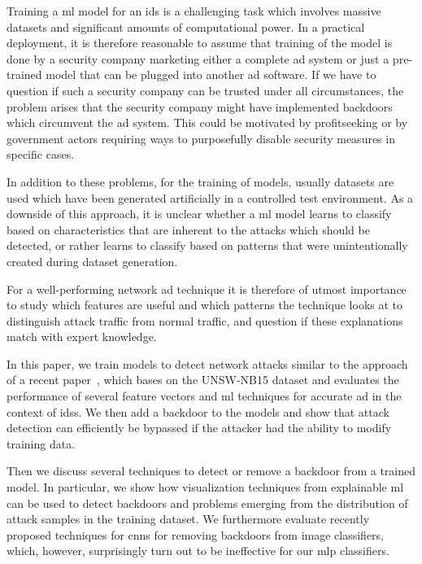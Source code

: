 \documentclass[9pt,sigconf,letterpaper,dvipsnames\ifx\removeHeaders\tempYes ,nonacm\fi]{acmart}
\newcommand{\unsw}{UNSW-NB15}
\begin{document}
Training a \gls{ml} model for an \gls{ids} is a challenging task which involves massive datasets and significant amounts of computational power. In a practical deployment, it is therefore reasonable to assume that training of the model is done by a security company marketing either a complete \gls{ad} system or just a pre-trained model that can be plugged into another \gls{ad} software. %
If we have to question if such a security company can be trusted under all circumstances, the problem arises that the security company might have implemented backdoors which circumvent the \gls{ad} system. This could be motivated by profitseeking or by government actors requiring ways to purposefully disable security measures in specific cases.

In addition to these problems, for the training of models, usually datasets are used which have been generated artificially in a controlled test environment. As a downside of this approach, it is unclear whether a \gls{ml} model learns to classify based on characteristics that are inherent to the attacks which should be detected, or rather learns to classify based on patterns that were unintentionally created during dataset generation.

For a well-performing network \gls{ad} technique it is therefore of utmost importance to study which features are useful and which patterns the technique looks at to distinguish attack traffic from normal traffic, and question if these explanations match with expert knowledge.

In this paper, we train models to detect network attacks similar to the approach of a recent paper~\cite{meghdouri_analysis_2018}, which bases on the \unsw{} dataset \cite{moustafa_unsw-nb15:_2015} and evaluates the performance of several feature vectors and \gls{ml} techniques for accurate \gls{ad} in the context of \glspl{ids}.
We then add a backdoor to the models and show that attack detection can efficiently be bypassed if the attacker had the ability to modify training data.

Then we discuss several techniques to detect or remove a backdoor from a trained model. In particular, we show how visualization techniques from explainable \gls{ml} can be used to detect backdoors and problems emerging from the distribution of attack samples in the training dataset.
We furthermore evaluate recently proposed techniques for \glspl{cnn} for removing backdoors from image classifiers, which, however, surprisingly turn out to be ineffective for our \gls{mlp} classifiers.
\end{document}
